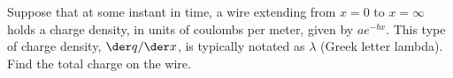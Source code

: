         Suppose that at some instant in time, a wire extending from $x=0$ to $x=\infty$ holds a charge density, in units of coulombs per meter,
        given by $ae^{-bx}$. This type of charge density, $\der q/\der x$, is typically notated as $\lambda$ (Greek letter lambda). Find the total
        charge on the wire.\answercheck
